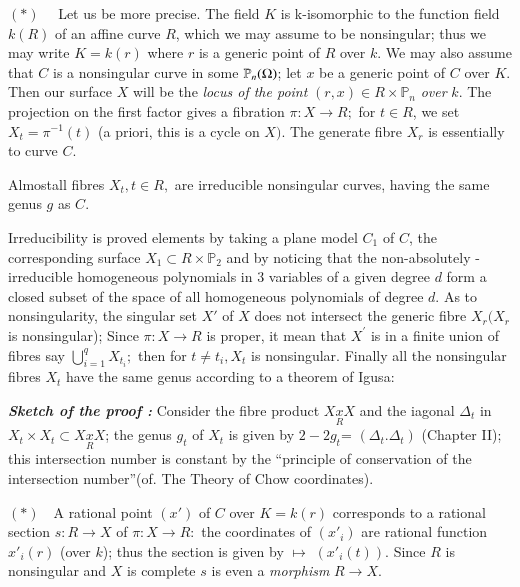 \medskip
\noindent
$(\ast)$~~ Let us be more precise. The field $K$ is k-isomorphic to
the function field $k(R)$ of an affine curve  $R$, which we may assume
to be nonsingular; thus we may write $K=k(r)$ where $r$ is a generic
point of $R$ over $k$. We may also assume that $C$ is a nonsingular
curve in some $\mathbb{P}_n(\large\Omega)$; let $x$ be a generic point
of $C$ over $K$. Then our surface $X$ will be the \textit{locus of the
  point} $(r,x)\in R \times \mathbb{P}_n$ \textit{over} $k$. The
projection on the first factor gives a fibration $\pi:X
\rightarrow R;$ for $t \in R$, we set $X_t=\pi ^{-1}(t)$ (a priori, this
is a cycle on $X)$. The generate fibre $X_r$ is essentially to curve $C$.  

\setcounter{lemma}{0}
\begin{lemma}\label{chap3:sec1:lem1}%
  Almost\pageoriginale all fibres $X_t , t \in   R,$ are irreducible nonsingular
  cur\-ves, having the same genus $g$ as $C$. 
\end{lemma}

Irreducibility is proved elements by taking a plane  model $C_1$ of
$C$, the corresponding surface $X_1 \subset R\times \mathbb{P}_2$ and by
noticing that the non-absolutely - irreducible homogeneous
polynomials in $3$ variables of a given degree $d$ form a closed
subset of the  space of all homogeneous polynomials of degree $d$. As
to nonsingularity, the singular set $X'$ of $X$ does not intersect
the generic fibre $X_r(X_r$ is nonsingular); Since $\pi  : X
\rightarrow R$ is proper, it mean that $X^{'}$ is in a finite union of
fibres say $\bigcup\limits^{q}_{i=1}X_{t_i};$ then for $t \neq t_i,
X_t$ is nonsingular. Finally all the nonsingular fibres $X_t$ have the
same genus according to a theorem of Igusa: 

\medskip
\noindent
\textit{\bf Sketch of the proof :} Consider the fibre product $X
\underset{R}{x}X$ and the iagonal $\Delta_t$ in $X_t \times X_t\subset
X\underset{R}{x}X$; the genus $g_t$ of $X_t$ is given by $2-2g_t$=
$(\Delta_t. \Delta_t)$ (Chapter II); this intersection number is
constant by the ``principle of conservation of the intersection
number''(of. The Theory of Chow coordinates).   

\noindent
$(\ast)$~~A rational point $(x')$ of $C$ over $K=k(r)$ corresponds to
a rational section $s:R\rightarrow X$ of $\pi : X\rightarrow R:$ the
coordinates of $(x'_i)$ are rational function $x'_{i}(r)$ (over $k$);
thus the section is given by $\mapsto$  $(x'_{i}(t))$. Since $R$ is
nonsingular 
and $X$ is complete $s$ is even a \textit{morphism} $R \rightarrow X$. 

